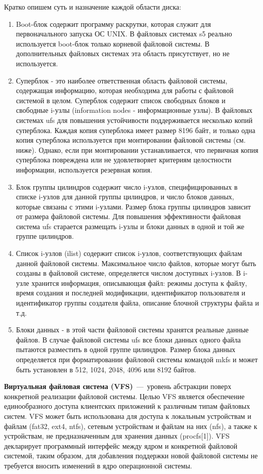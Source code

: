 \documentclass{article}
\begin{document}
Кратко опишем суть и назначение каждой области диска:
\begin{enumerate}
	\item Boot-блок содержит программу раскрутки, которая служит для первоначального запуска ОС UNIX. В файловых системах s5 реально используется boot-блок только корневой файловой системы. В дополнительных файловых системах эта область присутствует, но не используется.
	\item Суперблок - это наиболее ответственная область файловой системы, содержащая информацию, которая необходима для работы с файловой системой в целом. Суперблок содержит список свободных блоков и свободные i-узлы (information nodes - информационные узлы). В файловых системах ufs для повышения устойчивости поддерживается несколько копий суперблока. Каждая копия суперблока имеет размер 8196 байт, и только одна копия суперблока используется при монтировании файловой системы (см. ниже). Однако, если при монтировании устанавливается, что первичная копия суперблока повреждена или не удовлетворяет критериям целостности информации, используется резервная копия. 
	\item Блок группы цилиндров содержит число i-узлов, специфицированных в списке i-узлов для данной группы цилиндров, и число блоков данных, которые связаны с этими i-узлами. Размер блока группы цилиндров зависит от размера файловой системы. Для повышения эффективности файловая система ufs старается размещать i-узлы и блоки данных в одной и той же группе цилиндров. 
	\item Список i-узлов (ilist) содержит список i-узлов, соответствующих файлам данной файловой системы. Максимальное число файлов, которые могут быть созданы в файловой системе, определяется числом доступных i-узлов. В i-узле хранится информация, описывающая файл: режимы доступа к файлу, время создания и последней модификации, идентификатор пользователя и идентификатор группы создателя файла, описание блочной структуры файла и т.д.
	\item Блоки данных - в этой части файловой системы хранятся реальные данные файлов. В случае файловой системы ufs все блоки данных одного файла пытаются разместить в одной группе цилиндров. Размер блока данных определяется при форматировании файловой системы командой mkfs и может быть установлен в 512, 1024, 2048, 4096 или 8192 байтов. 
\end{enumerate}

\textbf{Виртуальная файловая система (VFS)}~---~уровень абстракции поверх конкретной реализации файловой системы. Целью VFS является обеспечение единообразного доступа клиентских приложений к различным типам файловых систем. VFS может быть использована для доступа к локальным устройствам и файлам (fat32, ext4, ntfs), сетевым устройствам и файлам на них (nfs), а также к устройствам, не предназначенным для хранения данных (procfs[1]). VFS декларирует программный интерфейс между ядром и конкретной файловой системой, таким образом, для добавления поддержки новой файловой системы не требуется вносить изменений в ядро операционной системы.
\end{document}

